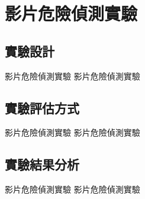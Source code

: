 \documentclass[class=NCU_thesis, crop=false]{standalone}
\begin{document}
\section{影片危險偵測實驗}
\subsection{實驗設計}
影片危險偵測實驗 影片危險偵測實驗

\subsection{實驗評估方式}
影片危險偵測實驗 影片危險偵測實驗

\subsection{實驗結果分析}
影片危險偵測實驗 影片危險偵測實驗
\end{document}

